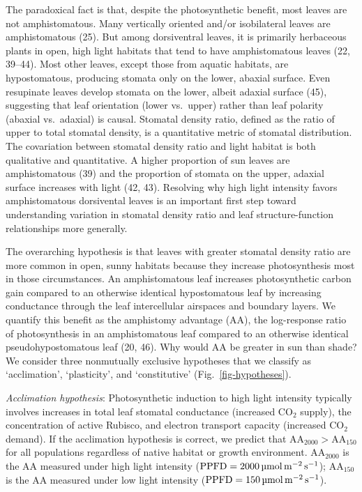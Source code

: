 \documentclass[
  letterpaper,
  DIV=11,
  numbers=noendperiod]{scrartcl}
\newcommand{\aahigh}{\mathrm{AA}_{2000}}
\newcommand{\aalow}{\mathrm{AA}_{150}}
\newcommand{\aax}{$\mathrm{AA}$}
\newcommand{\ppfdequals}[1]{$\mathrm{PPFD} = \qty{#1}{\micro\mol\raiseto{-2}\meter\raiseto{-1}\second}$}
\begin{document}
\begin{linenumbers}
\begin{doublespace}
The paradoxical fact is that, despite the photosynthetic benefit, most
leaves are not amphistomatous. Many vertically oriented and/or
isobilateral leaves are amphistomatous (25). But among dorsiventral
leaves, it is primarily herbaceous plants in open, high light habitats
that tend to have amphistomatous leaves (22, 39--44). Most other leaves,
except those from aquatic habitats, are hypostomatous, producing stomata
only on the lower, abaxial surface. Even resupinate leaves develop
stomata on the lower, albeit adaxial surface (45), suggesting that leaf
orientation (lower vs.~upper) rather than leaf polarity (abaxial
vs.~adaxial) is causal. Stomatal density ratio, defined as the ratio of
upper to total stomatal density, is a quantitative metric of stomatal
distribution. The covariation between stomatal density ratio and light
habitat is both qualitative and quantitative. A higher proportion of sun
leaves are amphistomatous (39) and the proportion of stomata on the
upper, adaxial surface increases with light (42, 43). Resolving why high
light intensity favors amphistomatous dorsivental leaves is an important
first step toward understanding variation in stomatal density ratio and
leaf structure-function relationships more generally.

The overarching hypothesis is that leaves with greater stomatal density
ratio are more common in open, sunny habitats because they increase
photosynthesis most in those circumstances. An amphistomatous leaf
increases photosynthetic carbon gain compared to an otherwise identical
hypostomatous leaf by increasing conductance through the leaf
intercellular airspaces and boundary layers. We quantify this benefit as
the amphistomy advantage (\aax{}), the log-response ratio of
photosynthesis in an amphistomatous leaf compared to an otherwise
identical pseudohypostomatous leaf (20, 46). Why would \aax{} be greater
in sun than shade? We consider three nonmutually exclusive hypotheses
that we classify as `acclimation', `plasticity', and `constitutive'
(Fig.~\ref{fig-hypotheses}).

\emph{Acclimation hypothesis}: Photosynthetic induction to high light
intensity typically involves increases in total leaf stomatal
conductance (increased CO\(_2\) supply), the concentration of active
Rubisco, and electron transport capacity (increased CO\(_2\) demand). If
the acclimation hypothesis is correct, we predict that
\(\aahigh{} > \aalow{}\) for all populations regardless of native
habitat or growth environment. \(\aahigh{}\) is the \aax{} measured
under high light intensity (\ppfdequals{2000}); \(\aalow{}\) is the
\aax{} measured under low light intensity (\ppfdequals{150}).


\end{doublespace}
\end{linenumbers}
\end{document}
